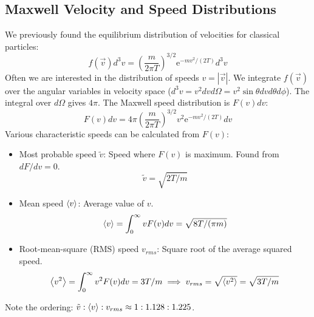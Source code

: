 \documentclass[10pt, letterpaper]{article}
\newcommand{\avg}[1]{\expval{#1}} %
\newcommand{\mathe}{\mathrm{e}} %
\begin{document}
\subsection{Maxwell Velocity and Speed Distributions}
We previously found the equilibrium distribution of velocities for classical particles:
\begin{equation*}
    f(\vec{v}) d^3v = \left( \frac{m}{2 \pi T} \right)^{3/2} \mathe^{-m v^2 / (2T)} d^3v
\end{equation*}
Often we are interested in the distribution of speeds $v = |\vec{v}|$. We integrate $f(\vec{v})$ over the angular variables in velocity space ($d^3v = v^2 dv d\Omega = v^2 \sin\theta dv d\theta d\phi$). The integral over $d\Omega$ gives $4\pi$.
The Maxwell speed distribution is $F(v) dv$:
\begin{equation}
    F(v) dv = 4 \pi \left( \frac{m}{2 \pi T} \right)^{3/2} v^2 \mathe^{-m v^2 / (2T)} dv
\end{equation}
Various characteristic speeds can be calculated from $F(v)$:
\begin{itemize}
    \item Most probable speed $\tilde{v}$: Speed where $F(v)$ is maximum. Found from $dF/dv = 0$.
        \begin{equation*} \tilde{v} = \sqrt{2T/m} \end{equation*}
    \item Mean speed $\avg{v}$: Average value of $v$.
        \begin{equation*} \avg{v} = \int_0^\infty v F(v) dv = \sqrt{8T/(\pi m)} \end{equation*}
    \item Root-mean-square (RMS) speed $v_{rms}$: Square root of the average squared speed.
        \begin{equation*} \avg{v^2} = \int_0^\infty v^2 F(v) dv = 3T/m \implies v_{rms} = \sqrt{\avg{v^2}} = \sqrt{3T/m} \end{equation*}
\end{itemize}
Note the ordering: $\tilde{v} : \avg{v} : v_{rms} \approx 1 : 1.128 : 1.225$.
\end{document}
